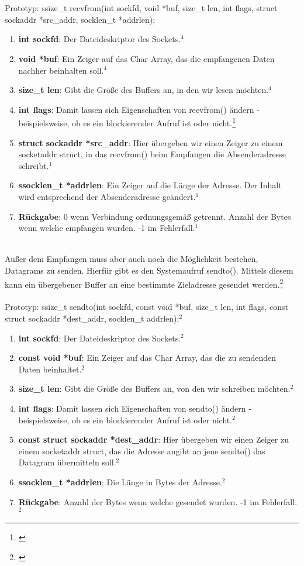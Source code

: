 \\\\
Prototyp: ssize\_t recvfrom(int sockfd, void *buf, size\_t len, int flags, struct sockaddr *src\_addr, socklen\_t *addrlen);
\begin{enumerate}
    \item \textbf{int sockfd}: Der Dateideskriptor des Sockets.$^{4}$
    \item \textbf{void *buf}: Ein Zeiger auf das Char Array, das die empfangenen Daten nachher beinhalten soll.$^{4}$
    \item \textbf{size\_t len}: Gibt die Größe des Buffers an, in den wir lesen möchten.$^{4}$
    \\
    \item \textbf{int flags}: Damit lassen sich Eigenschaften von recvfrom() ändern - beispielsweise, ob es ein blockierender Aufruf ist oder nicht.\footnote[1]{\cite[Vgl.][]{SRV17}}
    \item \textbf{struct sockaddr *src\_addr}: Hier übergeben wir einen Zeiger zu einem socketaddr struct, in das recvfrom() beim Empfangen die Absenderadresse schreibt.$^{1}$
    \item \textbf{ssocklen\_t *addrlen}: Ein Zeiger auf die Länge der Adresse. Der Inhalt wird entsprechend der Absenderadresse geändert.$^{1}$
    \item \textbf{Rückgabe}: 0 wenn Verbindung ordnungsgemäß getrennt. Anzahl der Bytes wenn welche empfangen wurden. -1 im Fehlerfall.$^{1}$
\end{enumerate} 
\ \\%
Außer dem Empfangen muss aber auch noch die Möglichkeit bestehen, Datagrams zu senden. Hierfür gibt es den Systemaufruf sendto(). Mittels diesem kann ein übergebener Buffer an eine bestimmte Zieladresse gesendet werden.\footnote[2]{\cite[Vgl.][]{SRV18}}
\\\\
Prototyp: ssize\_t sendto(int sockfd, const void *buf, size\_t len, int flags, const struct sockaddr *dest\_addr, socklen\_t addrlen);$^{2}$
\begin{enumerate}
    \item \textbf{int sockfd}: Der Dateideskriptor des Sockets.$^{2}$
    \item \textbf{const void *buf}: Ein Zeiger auf das Char Array, das die zu sendenden Daten beinhaltet.$^{2}$
    \item \textbf{size\_t len}: Gibt die Größe des Buffers an, von den wir schreiben möchten.$^{2}$
    \item \textbf{int flags}: Damit lassen sich Eigenschaften von sendto() ändern - beispielsweise, ob es ein blockierender Aufruf ist oder nicht.$^{2}$
    \item \textbf{const struct sockaddr *dest\_addr}: Hier übergeben wir einen Zeiger zu einem socketaddr struct, das die Adresse angibt an jene sendto() das Datagram übermitteln soll.$^{2}$
    \item \textbf{ssocklen\_t *addrlen}: Die Länge in Bytes der Adresse.$^{2}$
    \item \textbf{Rückgabe}: Anzahl der Bytes wenn welche gesendet wurden. -1 im Fehlerfall.$^{2}$
\end{enumerate} 
